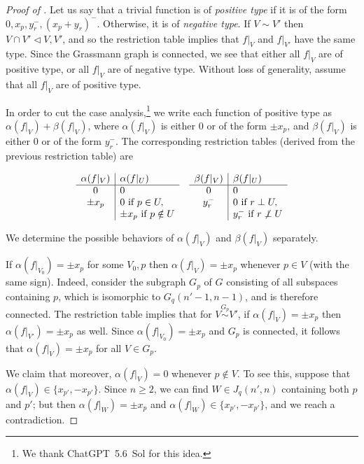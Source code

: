 \documentclass{article}
\theoremstyle{definition}
\providecommand{\subs}{\triangleleft}
\begin{document}
\begin{proof}[Proof of ]
Let us say that a trivial function is of \emph{positive type} if it is of the form $0,x_p,y_r^-,(x_p+y_r)^-$. Otherwise, it is of \emph{negative type}. If $V \sim V'$ then $V \cap V' \subs V,V'$, and so the restriction table implies that $f|_V$ and $f|_{V'}$ have the same type. Since the Grassmann graph is connected, we see that either all $f|_V$ are of positive type, or all $f|_V$ are of negative type. Without loss of generality, assume that all $f|_V$ are of positive type.

In order to cut the case analysis,\footnote{We thank ChatGPT~5.6~Sol for this idea.} we write each function of positive type as $\alpha(f|_V) + \beta(f|_V)$, where $\alpha(f|_V)$ is either $0$ or of the form $\pm x_p$, and $\beta(f|_V)$ is either $0$ or of the form $y_r^-$. The corresponding restriction tables (derived from the previous restriction table) are

\[
\begin{array}[t]{c|l}
\alpha(f|_V) & \alpha(f|_U) \\\hline
0 & 0 \\
\pm x_p & 0 \text{ if } p \in U, \\ & \pm x_p \text{ if } p \notin U
\end{array}
\quad
\begin{array}[t]{c|l}
\beta(f|_V) & \beta(f|_U) \\\hline
0 & 0 \\
y_r^- & 0 \text{ if } r \perp U, \\ & y_r^- \text{ if } r \not\perp U
\end{array}
\]

We determine the possible behaviors of $\alpha(f|_V)$ and $\beta(f|_V)$ separately.

If $\alpha(f|_{V_0}) = \pm x_p$ for some $V_0,p$ then $\alpha(f|_V) = \pm x_p$ whenever $p \in V$ (with the same sign).
Indeed, consider the subgraph $G_p$ of $G$ consisting of all subspaces containing $p$, which is isomorphic to $G_q(n'-1,n-1)$, and is therefore connected. The restriction table implies that for $V \stackrel{G_p}\sim V'$, if $\alpha(f|_V) = \pm x_p$ then $\alpha(f|_{V'}) = \pm x_p$ as well. Since $\alpha(f|_{V_0}) = \pm x_p$ and $G_p$ is connected, it follows that $\alpha(f|_V) = \pm x_p$ for all $V \in G_p$.

We claim that moreover, $\alpha(f|_V) = 0$ whenever $p \notin V$. To see this, suppose that $\alpha(f|_V) \in \{ x_{p'}, -x_{p'} \}$. Since $n \ge 2$, we can find $W \in J_q(n',n)$ containing both $p$ and $p'$; but then $\alpha(f|_W) = \pm x_p$ and $\alpha(f|_W) \in \{x_{p'}, -x_{p'}\}$, and we reach a contradiction.


\end{proof}
\end{document}
